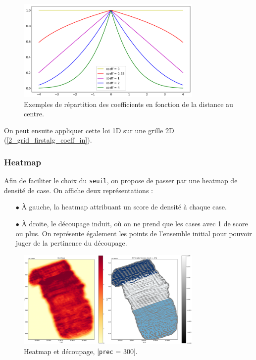 \documentclass[12pt]{article}
\begin{document}
    \begin{figure}[ht!]
        \centering
        \includegraphics[width=0.8\textwidth]{Images/Grid_FirstAlg_CoeffCurve.png}
        \caption{Exemples de répartition des coefficients en fonction de la distance au centre.}
    \end{figure}
    
    \label{2_grid_firstalg_coeff_out} On peut ensuite appliquer cette loi 1D sur une grille 2D (\ref{2_grid_firstalg_coeff_in}).

\subsubsection{Heatmap}

    Afin de faciliter le choix du \texttt{seuil}, on propose de passer par une heatmap de densité de case. On affiche deux représentations :

    \begin{enumerate}
        \item[$\bullet$] À gauche, la heatmap attribuant un score de densité à chaque case.
        \item[$\bullet$] À droite, le découpage induit, où on ne prend que les cases avec 1 de score ou plus. On représente également les points de l'ensemble initial pour pouvoir juger de la pertinence du découpage.
    \end{enumerate}

    \begin{figure}[ht!]
        \centering
        \includegraphics[width=0.8\textwidth]{Images/Grid_Heatmap_p300.png}
        \caption{Heatmap et découpage, [\texttt{prec} = 300].}
    \end{figure}
    
\end{document}
